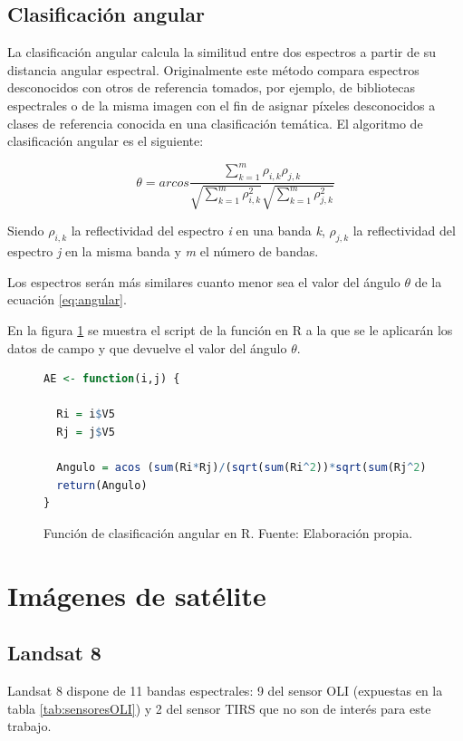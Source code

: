 \subsection{Clasificación angular}
La clasificación angular calcula la similitud entre dos espectros a partir de su distancia angular espectral. Originalmente este método compara espectros desconocidos con otros de referencia tomados, por ejemplo, de bibliotecas espectrales o de la misma imagen \citep{girouard2004validated} con el fin de asignar píxeles desconocidos a clases de referencia conocida en una clasificación temática. El algoritmo de clasificación angular es el siguiente:

\begin{equation} \label{eq:angular}
	\theta = arcos \frac{\sum_{k=1}^{m} \rho_{i,k} \rho_{j,k}}{\sqrt{\sum_{k=1}^{m} \rho_{i,k}^{2}} \sqrt{\sum_{k=1}^{m} \rho_{j,k}^{2}}}
\end{equation}\Sep

Siendo $\rho_{i,k}$ la reflectividad del espectro \textit{i} en una banda \textit{k}, $\rho_{j,k}$ la reflectividad del espectro \textit{j} en la misma banda y \textit{m} el número de bandas.\Sep

Los espectros serán más similares cuanto menor sea el valor del ángulo $\theta$ de la ecuación \ref{eq:angular}.\Sep

En la figura \ref{fig:AE} se muestra el script de la función en R a la que se le aplicarán los datos de campo y que devuelve el valor del ángulo $\theta$.

\begin{figure}
\centering
\begin{lstlisting}[language = R, frame = single]
AE <- function(i,j) {
  
  Ri = i$V5
  Rj = j$V5

  Angulo = acos (sum(Ri*Rj)/(sqrt(sum(Ri^2))*sqrt(sum(Rj^2))))
  return(Angulo)
}
\end{lstlisting}
\caption[Función clasificación angular]{Función de clasificación angular en R. Fuente: Elaboración propia.}
\label{fig:AE}
\end{figure}

\section{Imágenes de satélite}
\subsection{Landsat 8}
Landsat 8 dispone de 11 bandas espectrales: 9 del sensor \ac{OLI} (expuestas en la tabla \ref{tab:sensoresOLI}) y 2 del sensor \ac{TIRS} que no son de interés para este trabajo.\Sep

